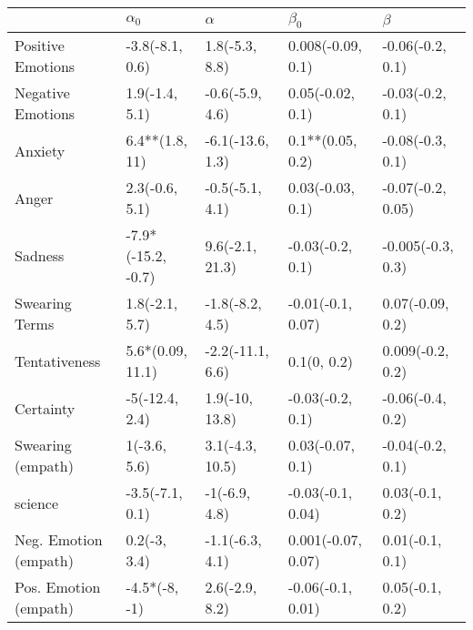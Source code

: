 \begin{tabular}{lllll}
\toprule
{} &          $\alpha_0$ &          $\alpha$ &           $\beta_0$ &            $\beta$ \\
\midrule
Positive Emotions     &     -3.8(-8.1, 0.6) &    1.8(-5.3, 8.8) &   0.008(-0.09, 0.1) &   -0.06(-0.2, 0.1) \\
Negative Emotions     &      1.9(-1.4, 5.1) &   -0.6(-5.9, 4.6) &    0.05(-0.02, 0.1) &   -0.03(-0.2, 0.1) \\
Anxiety               &      6.4**(1.8, 11) &  -6.1(-13.6, 1.3) &    0.1**(0.05, 0.2) &   -0.08(-0.3, 0.1) \\
Anger                 &      2.3(-0.6, 5.1) &   -0.5(-5.1, 4.1) &    0.03(-0.03, 0.1) &  -0.07(-0.2, 0.05) \\
Sadness               &  -7.9*(-15.2, -0.7) &   9.6(-2.1, 21.3) &    -0.03(-0.2, 0.1) &  -0.005(-0.3, 0.3) \\
Swearing Terms        &      1.8(-2.1, 5.7) &   -1.8(-8.2, 4.5) &   -0.01(-0.1, 0.07) &   0.07(-0.09, 0.2) \\
Tentativeness         &    5.6*(0.09, 11.1) &  -2.2(-11.1, 6.6) &         0.1(0, 0.2) &   0.009(-0.2, 0.2) \\
Certainty             &      -5(-12.4, 2.4) &    1.9(-10, 13.8) &    -0.03(-0.2, 0.1) &   -0.06(-0.4, 0.2) \\
Swearing (empath)     &        1(-3.6, 5.6) &   3.1(-4.3, 10.5) &    0.03(-0.07, 0.1) &   -0.04(-0.2, 0.1) \\
science               &     -3.5(-7.1, 0.1) &     -1(-6.9, 4.8) &   -0.03(-0.1, 0.04) &    0.03(-0.1, 0.2) \\
Neg. Emotion (empath) &        0.2(-3, 3.4) &   -1.1(-6.3, 4.1) &  0.001(-0.07, 0.07) &    0.01(-0.1, 0.1) \\
Pos. Emotion (empath) &       -4.5*(-8, -1) &    2.6(-2.9, 8.2) &   -0.06(-0.1, 0.01) &    0.05(-0.1, 0.2) \\
\bottomrule
\end{tabular}
